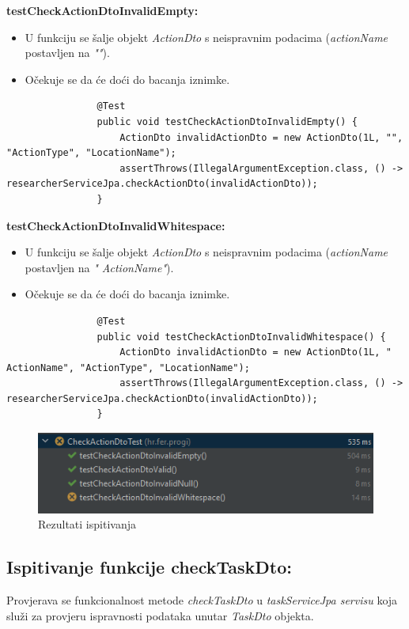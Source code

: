 			\textbf{testCheckActionDtoInvalidEmpty:}
			\begin{itemize}
				\item U funkciju se šalje objekt \textit{ActionDto} s neispravnim podacima (\textit{actionName} postavljen na \textit{""}).
				\item Očekuje se da će doći do bacanja iznimke.
			\end{itemize}
			\begin{lstlisting}
				@Test
				public void testCheckActionDtoInvalidEmpty() {
					ActionDto invalidActionDto = new ActionDto(1L, "", "ActionType", "LocationName");
					assertThrows(IllegalArgumentException.class, () -> researcherServiceJpa.checkActionDto(invalidActionDto));
				}
			\end{lstlisting}
			
			\textbf{testCheckActionDtoInvalidWhitespace:}
			\begin{itemize}
				\item U funkciju se šalje objekt \textit{ActionDto} s neispravnim podacima (\textit{actionName} postavljen na \textit{" ActionName"}).
				\item Očekuje se da će doći do bacanja iznimke.
			\end{itemize}
			\begin{lstlisting}
				@Test
				public void testCheckActionDtoInvalidWhitespace() {
					ActionDto invalidActionDto = new ActionDto(1L, " ActionName", "ActionType", "LocationName");
					assertThrows(IllegalArgumentException.class, () -> researcherServiceJpa.checkActionDto(invalidActionDto));
				}
			\end{lstlisting}
			
			\begin{figure}[H]
				\includegraphics[scale=1]{slike/checkActionDtoTest.png} 
				\centering
				\caption{Rezultati ispitivanja}
				\label{fig:promjene}
			\end{figure}
			
			
			\subsection{Ispitivanje funkcije checkTaskDto:}
			Provjerava se funkcionalnost metode \textit{checkTaskDto} u \textit{taskServiceJpa servisu} koja služi za provjeru ispravnosti podataka unutar \textit{TaskDto} objekta.
			

